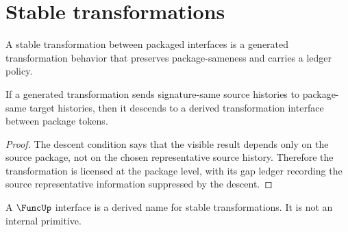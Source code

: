\section{Stable transformations}

\begin{definition}
\label{def:stable-transformation}
A stable transformation between packaged interfaces is a generated transformation behavior that preserves package-sameness and carries a ledger policy.
\end{definition}

\begin{theorem}
\label{thm:stable-transformations-descend-to-packages-core}
If a generated transformation sends signature-same source histories to package-same target histories, then it descends to a derived transformation interface between package tokens.
\end{theorem}
\begin{proof}
The descent condition says that the visible result depends only on the source package, not on the chosen representative source history. Therefore the transformation is licensed at the package level, with its gap ledger recording the source representative information suppressed by the descent.
\end{proof}

\begin{corollary}
\label{cor:function-like-interface-seed-not-primitive}
A \(\FuncUp\) interface is a derived name for stable transformations. It is not an internal primitive.
\end{corollary}

